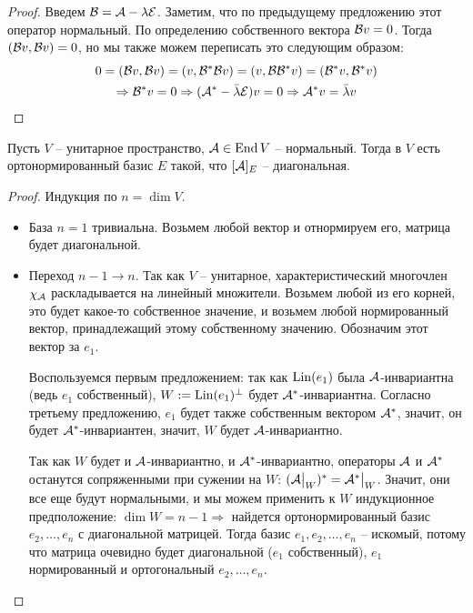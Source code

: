 \begin{proof}
    Введем $\mathcal{B} = \mathcal{A} - \lambda \mathcal{E}$. Заметим, что по предыдущему предложению этот оператор нормальный.
    По определению собственного вектора $\mathcal{B} v = 0$. Тогда $(\mathcal{B} v, \mathcal{B} v) = 0$, но мы также можем переписать это следующим образом:
    \begin{gather*}
        0 = (\mathcal{B} v, \mathcal{B} v) = (v, \mathcal{B}^*\mathcal{B} v) = (v, \mathcal{B}\mathcal{B}^* v) = (\mathcal{B}^*v, \mathcal{B}^*v) \\
        \Rightarrow \mathcal{B}^* v = 0 \Rightarrow (\mathcal{A}^* - \bar{\lambda}\mathcal{E})v = 0 \Rightarrow \mathcal{A}^* v = \bar{\lambda}v
    \end{gather*}
\end{proof}

\begin{theorem}
    Пусть $V$ -- унитарное пространство, $\mathcal{A} \in \operatorname{End} V$ -- нормальный. 
    Тогда в $V$ есть ортонормированный базис $E$ такой, что $[\mathcal{A}]_E$ -- диагональная.
\end{theorem}
\begin{proof}
    Индукция по $n = \dim V$.
    \begin{itemize}
        \item База $n = 1$ тривиальна. Возьмем любой вектор и отнормируем его, матрица будет диагональной.
        \item Переход $n - 1 \to n$. 
        Так как $V$ -- унитарное, характеристический многочлен $\chi_{\mathcal{A}}$ раскладывается на линейный множители. 
        Возьмем любой из его корней, это будет какое-то собственное значение, и возьмем любой нормированный вектор, принадлежащий этому собственному значению. 
        Обозначим этот вектор за $e_1$. 

        Воспользуемся первым предложением: так как $\operatorname{Lin}(e_1)$ была $\mathcal{A}$-инвариантна (ведь $e_1$ собственный), $W := \operatorname{Lin}(e_1)^\perp$ будет $\mathcal{A}^*$-инвариантна.
        Согласно третьему предложению, $e_1$ будет также собственным вектором $\mathcal{A}^*$, значит, он будет $\mathcal{A}^*$-инвариантен, значит, $W$ будет $\mathcal{A}$-инвариантно.

        Так как $W$ будет и $\mathcal{A}$-инвариантно, и $\mathcal{A}^*$-инвариантно, операторы $\mathcal{A}$ и $\mathcal{A}^*$ останутся сопряженными при сужении на $W$: $(\mathcal{A}\big|_W)^* = \mathcal{A}^*\big|_W$. 
        Значит, они все еще будут нормальными, и мы можем применить к $W$ индукционное предположение: $\dim W = n - 1 \Rightarrow$ найдется ортонормированный базис $e_2, \dots, e_n$ с диагональной матрицей.
        Тогда базис $e_1, e_2, \dots, e_n$ -- искомый, потому что матрица очевидно будет диагональной ($e_1$ собственный), $e_1$ нормированный и ортогональный $e_2, \dots, e_n$.
    \end{itemize}
\end{proof}

